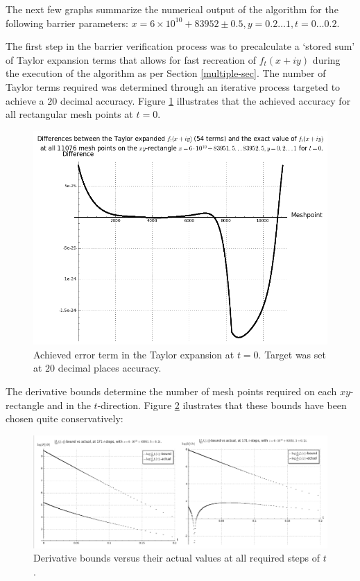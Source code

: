 \documentclass[a4paper,11pt,twoside]{amsart}
\begin{document}
The next few graphs summarize the numerical output of the algorithm for the following barrier parameters: $x=6\times 10^{10}+83952 \pm 0.5, y = 0.2 \dots 1, t=0 \dots 0.2$.  

The first step in the barrier verification process was to precalculate a `stored sum' of Taylor expansion terms that allows for fast recreation of $f_t(x+iy)$ during the execution of the algorithm as per Section \ref{multiple-sec}. The number of Taylor terms required was determined through an iterative process targeted to achieve a $20$ decimal accuracy.  Figure \ref{fig1} illustrates that the achieved accuracy for all rectangular mesh points at $t=0$.

\begin{figure}[ht!]
  \includegraphics[width=0.7\linewidth]{BarrieraccuracyTaylor}
  \caption{Achieved error term in the Taylor expansion at $t=0$. Target was set at $20$ decimal places accuracy.}\label{fig1}
\end{figure}

The derivative bounds determine the number of mesh points required on each $xy$-rectangle and in the $t$-direction. Figure \ref{fig2} ilustrates that these bounds have been chosen quite conservatively:

\begin{figure}[ht!]
  \includegraphics[width=1.0\linewidth]{Derivativebounds}
  \caption{Derivative bounds versus their actual values at all required steps of $t$.}\label{fig2}
\end{figure}
\end{document}
